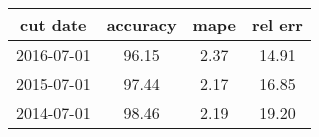 \begin{tabular}{cccc}
\toprule
\textbf{cut date} & \textbf{accuracy} & \textbf{mape} & \textbf{rel err} \\
\midrule
       2016-07-01 &             96.15 &          2.37 &            14.91 \\
       2015-07-01 &             97.44 &          2.17 &            16.85 \\
       2014-07-01 &             98.46 &          2.19 &            19.20 \\
\bottomrule
\end{tabular}

